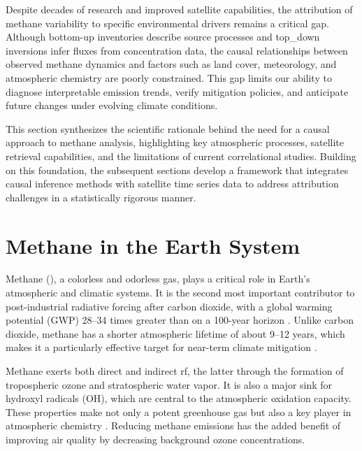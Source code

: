 \cleardoublepage
\label{chap:intro}


Despite decades of research and improved satellite capabilities, the attribution of methane variability to specific environmental drivers remains a critical gap. Although bottom-up inventories describe source processes and \gls{top_down} inversions infer fluxes from concentration data, the causal relationships between observed methane dynamics and factors such as land cover, meteorology, and atmospheric chemistry are poorly constrained. This gap limits our ability to diagnose interpretable emission trends, verify mitigation policies, and anticipate future changes under evolving climate conditions.

This section synthesizes the scientific rationale behind the need for a causal approach to methane analysis, highlighting key atmospheric processes, satellite retrieval capabilities, and the limitations of current correlational studies. Building on this foundation, the subsequent sections develop a framework that integrates causal inference methods with satellite time series data to address attribution challenges in a statistically rigorous manner.

\section{Methane in the Earth System}

Methane (), a colorless and odorless gas, plays a critical role in Earth's atmospheric and climatic systems. It is the second most important contributor to post-industrial radiative forcing after carbon dioxide, with a global warming potential (GWP) 28--34 times greater than  on a 100-year horizon \cite{tian_catalytic_2021, IPCC2013}. Unlike carbon dioxide, methane has a shorter atmospheric lifetime of about 9--12 years, which makes it a particularly effective target for near-term climate mitigation \cite{Shindell2012, Etminan2016}.

Methane exerts both direct and indirect \gls{rf}, the latter through the formation of tropospheric ozone and stratospheric water vapor. It is also a major sink for hydroxyl radicals (OH), which are central to the atmospheric oxidation capacity. These properties make  not only a potent greenhouse gas but also a key player in atmospheric chemistry \cite{Shindell2012, Etminan2016}. Reducing methane emissions has the added benefit of improving air quality by decreasing background ozone concentrations.


